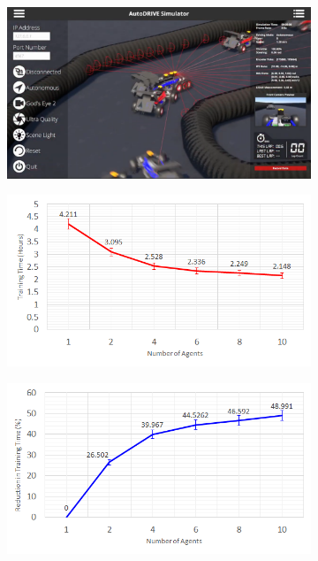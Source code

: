 \documentclass[letterpaper, 10 pt, conference]{ieeeconf}  %
\begin{document}
\begin{figure}[t]
     \centering
     \begin{subfigure}[b]{0.32\linewidth}
         \centering
         \includegraphics[width=\linewidth]{Fig11a.png}
         \caption{}
         \label{fig11a}
     \end{subfigure}
     \hfill
     \begin{subfigure}[b]{0.32\linewidth}
         \centering
         \includegraphics[width=\linewidth]{Fig11b.png}
         \caption{}
         \label{fig11b}
     \end{subfigure}
     \hfill
     \begin{subfigure}[b]{0.32\linewidth}
         \centering
         \includegraphics[width=\linewidth]{Fig11c.png}

\end{subfigure}
\end{figure}
\end{document}
